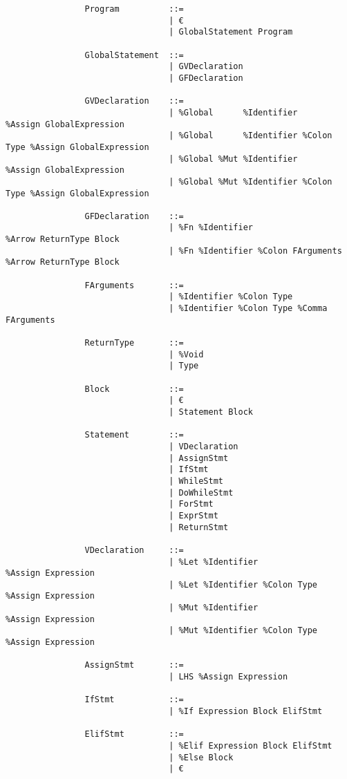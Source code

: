 \documentclass{article}
\begin{document}
			\begin{verbatim}
				Program          ::=
				                 | €
				                 | GlobalStatement Program
				                 
				GlobalStatement  ::=
				                 | GVDeclaration
				                 | GFDeclaration
				                 
				GVDeclaration    ::=
				                 | %Global      %Identifier             %Assign GlobalExpression
				                 | %Global      %Identifier %Colon Type %Assign GlobalExpression
				                 | %Global %Mut %Identifier             %Assign GlobalExpression
				                 | %Global %Mut %Identifier %Colon Type %Assign GlobalExpression
				                 
				GFDeclaration    ::=
				                 | %Fn %Identifier                   %Arrow ReturnType Block
				                 | %Fn %Identifier %Colon FArguments %Arrow ReturnType Block
				                 
				FArguments       ::=
				                 | %Identifier %Colon Type
				                 | %Identifier %Colon Type %Comma FArguments
				
				ReturnType       ::=
				                 | %Void
				                 | Type
				                 
				Block            ::=
				                 | €
				                 | Statement Block
				
				Statement        ::=
				                 | VDeclaration
				                 | AssignStmt
				                 | IfStmt
				                 | WhileStmt
				                 | DoWhileStmt
				                 | ForStmt
				                 | ExprStmt
				                 | ReturnStmt
				                 
				VDeclaration     ::=
				                 | %Let %Identifier             %Assign Expression
				                 | %Let %Identifier %Colon Type %Assign Expression
				                 | %Mut %Identifier             %Assign Expression
				                 | %Mut %Identifier %Colon Type %Assign Expression
				                 
				AssignStmt       ::=
				                 | LHS %Assign Expression
				                 
				IfStmt           ::=
				                 | %If Expression Block ElifStmt
				                 
				ElifStmt         ::=
				                 | %Elif Expression Block ElifStmt
				                 | %Else Block
				                 | €
				                 

\end{verbatim}
\end{document}
